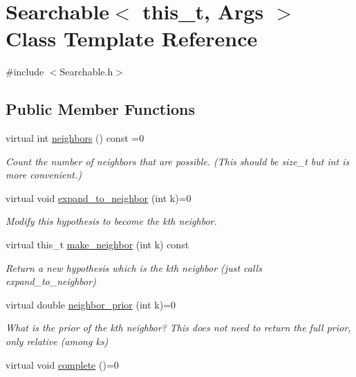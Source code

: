 \hypertarget{class_searchable}{}\section{Searchable$<$ this\+\_\+t, Args $>$ Class Template Reference}
\label{class_searchable}


{\ttfamily \#include $<$Searchable.\+h$>$}

\subsection*{Public Member Functions}
\begin{DoxyCompactItemize}
\item 
virtual int \hyperlink{class_searchable_a68819cd23119615baa51d65451765c74}{neighbors} () const =0
\begin{DoxyCompactList}\small\item\em Count the number of neighbors that are possible. (This should be size\+\_\+t but int is more convenient.) \end{DoxyCompactList}\item 
virtual void \hyperlink{class_searchable_a9088dba3920f4c66ce671aa16a7d29a4}{expand\+\_\+to\+\_\+neighbor} (int k)=0
\begin{DoxyCompactList}\small\item\em Modify this hypothesis to become the k\textquotesingle{}th neighbor. \end{DoxyCompactList}\item 
virtual this\+\_\+t \hyperlink{class_searchable_ac7d4105db85a6601dcb406074bdb3f8f}{make\+\_\+neighbor} (int k) const
\begin{DoxyCompactList}\small\item\em Return a new hypothesis which is the k\textquotesingle{}th neighbor (just calls expand\+\_\+to\+\_\+neighbor) \end{DoxyCompactList}\item 
virtual double \hyperlink{class_searchable_aa6f72073717a4df0d22c73705555b13a}{neighbor\+\_\+prior} (int k)=0
\begin{DoxyCompactList}\small\item\em What is the prior of the k\textquotesingle{}th neighbor? This does not need to return the full prior, only relative (among ks) \end{DoxyCompactList}\item 
virtual void \hyperlink{class_searchable_a29ab2eb0471e2e9d96d39f0349f21571}{complete} ()=0

\end{DoxyCompactItemize}

